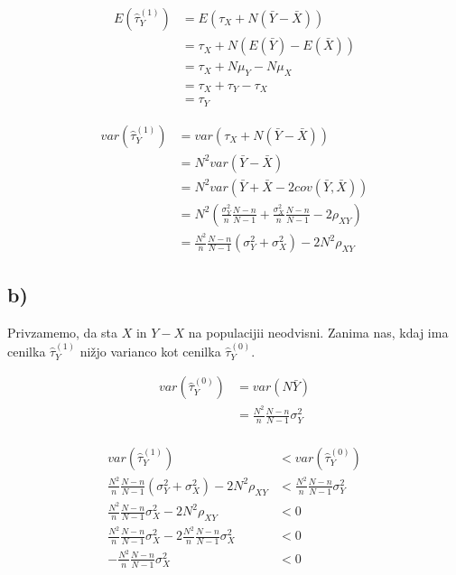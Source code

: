 \documentclass[A4paper, 11pt]{article}
\begin{document}
\[ 
\begin{split}
E(\hat{\tau}_Y ^ {(1)}) & = E(\tau_X + N (\bar{Y} - \bar{X})) \\
			       & = \tau_X  + N (E(\bar{Y}) - E(\bar{X})) \\
			       & = \tau_X + N \mu_Y - N \mu_X \\
			       & = \tau_X + \tau_Y - \tau_X \\
			       & = \tau_Y
\end{split}
\]

\[
\begin{split}
var(\hat{\tau}_Y ^ {(1)})  & = var(\tau_X + N (\bar{Y} - \bar{X})) \\
				& = N^2 var( \bar{Y} - \bar{X} ) \\
				& = N^2 var( \bar{Y} + \bar{X} - 2 cov(\bar{Y},\bar{X}) ) \\
				& = N^2 ( \frac{\sigma_Y^2}{n} \frac{N - n}{N - 1} + \frac{\sigma_X^2}{n} \frac{N - n}{N - 1} - 2\rho_{XY} ) \\
				&= \frac{N^2}{n} \frac{N - n}{N - 1} (\sigma_Y^2 + \sigma_X^2) - 2 N^2 \rho_{XY}
\end{split}
\]

\subsection*{b)}
Privzamemo, da sta $X$ in $Y - X$ na populacijii neodvisni. Zanima nas, kdaj ima cenilka $\hat{\tau}_Y ^ {(1)}$ nižjo varianco kot cenilka $\hat{\tau}_Y ^ {(0)}$.

\[
\begin{split}
var(\hat{\tau}_Y ^ {(0)}) & = var(N \bar{Y}) \\
                                          & = \frac{N^2}{n} \frac{N - n}{N - 1} \sigma_Y^2
\end{split}
\]
\\
\[
\begin{split}
var(\hat{\tau}_Y ^ {(1)}) & < var(\hat{\tau}_Y ^ {(0)}) \\
 \frac{N^2}{n} \frac{N - n}{N - 1} (\sigma_Y^2 + \sigma_X^2) - 2 N^2 \rho_{XY} & < \frac{N^2}{n} \frac{N - n}{N - 1} \sigma_Y^2 \\
 \frac{N^2}{n} \frac{N - n}{N - 1} \sigma_X^2 - 2 N^2 \rho_{XY} & < 0 \\
 \frac{N^2}{n} \frac{N - n}{N - 1} \sigma_X^2 - 2 \frac{N^2}{n} \frac{N - n}{N - 1} \sigma_X^2 & < 0 \\
 - \frac{N^2}{n} \frac{N - n}{N - 1} \sigma_X^2  & < 0 \\
\end{split}
\]
\end{document}
